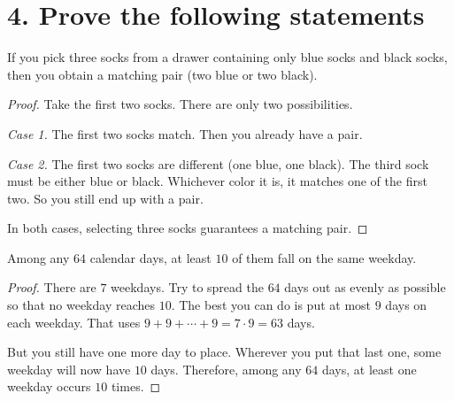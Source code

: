 \section*{4. Prove the following statements}

\begin{theorem}[a]
If you pick three socks from a drawer containing only blue socks and black socks,
then you obtain a matching pair (two blue or two black).
\end{theorem}
\begin{proof}
Take the first two socks. There are only two possibilities.

\emph{Case 1.} The first two socks match. Then you already have a pair.

\emph{Case 2.} The first two socks are different (one blue, one black).
The third sock must be either blue or black. Whichever color it is, it matches one
of the first two. So you still end up with a pair.

In both cases, selecting three socks guarantees a matching pair.
\end{proof}

\begin{theorem}[b]
Among any $64$ calendar days, at least $10$ of them fall on the same weekday.
\end{theorem}
\begin{proof}
There are $7$ weekdays. Try to spread the $64$ days out as evenly as possible
so that no weekday reaches $10$. The best you can do is put at most $9$ days
on each weekday. That uses $9+9+\cdots+9=7\cdot 9=63$ days.

But you still have one more day to place. Wherever you put that last one, some
weekday will now have $10$ days. Therefore, among any $64$ days, at least one
weekday occurs $10$ times.
\end{proof}
